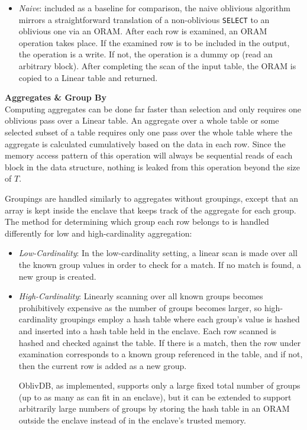 \documentclass[conference]{IEEEtran}
\def\name/{OblivDB}
\begin{document}
\begin{itemize}
\item \textit{Naive}: included as a baseline for comparison, the naive oblivious algorithm mirrors a straightforward translation of a non-oblivious \texttt{SELECT} to an oblivious one via an ORAM. After each row is examined, an ORAM operation takes place. If the examined row is to be included in the output, the operation is a write. If not, the operation is a dummy op (read an arbitrary block). After completing the scan of the input table, the ORAM is copied to a Linear table and returned.
\end{itemize}

\medskip \noindent \textbf{Aggregates \& Group By}\\
Computing aggregates can be done far faster than selection and only requires one oblivious pass over a Linear table. An aggregate over a whole table or some selected subset of a table requires only one pass over the whole table where the aggregate is calculated cumulatively based on the data in each row. Since the memory access pattern of this operation will always be sequential reads of each block in the data structure, nothing is leaked from this operation beyond the size of $T$. 

Groupings are handled similarly to aggregates without groupings, except that an array is kept inside the enclave that keeps track of the aggregate for each group. The method for determining which group each row belongs to is handled differently for low and high-cardinality aggregation:
\begin{itemize}
\item \textit{Low-Cardinality}: In the low-cardinality setting, a linear scan is made over all the known group values in order to check for a match. If no match is found, a new group is created. 

\item \textit{High-Cardinality}: Linearly scanning over all known groups becomes prohibitively expensive as the number of groups becomes larger, so high-cardinality groupings employ a hash table where each group's value is hashed and inserted into a hash table held in the enclave. Each row scanned is hashed and checked against the table. If there is a match, then the row under examination corresponds to a known group referenced in the table, and if not, then the current row is added as a new group. 

\name/, as implemented, supports only a large fixed total number of groups (up to as many as can fit in an enclave), but it can be extended to support arbitrarily large numbers of groups by storing the hash table in an ORAM outside the enclave instead of in the enclave's trusted memory. 
\end{itemize}
\end{document}
